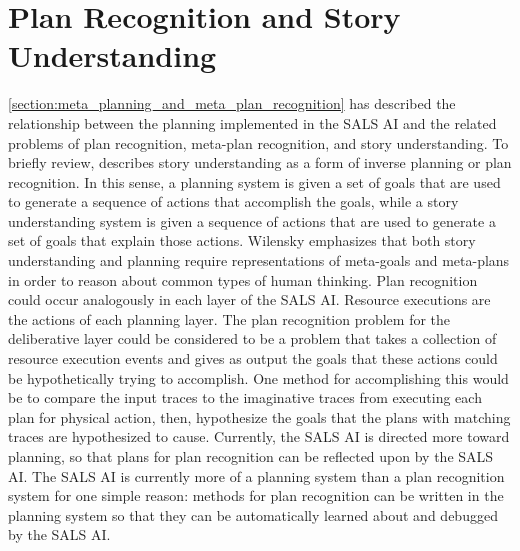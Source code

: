 \section{Plan Recognition and Story Understanding}

{\mbox{\autoref{section:meta_planning_and_meta_plan_recognition}}} has
described the relationship between the planning implemented in the
SALS AI and the related problems of plan recognition, meta-plan
recognition, and story understanding.  To briefly review,
\cite{wilensky:1981} describes story understanding as a form of
inverse planning or plan recognition.  In this sense, a planning
system is given a set of goals that are used to generate a sequence of
actions that accomplish the goals, while a story understanding system
is given a sequence of actions that are used to generate a set of
goals that explain those actions.  Wilensky emphasizes that both story
understanding and planning require representations of meta-goals and
meta-plans in order to reason about common types of human thinking.
Plan recognition could occur analogously in each layer of the SALS AI.
Resource executions are the actions of each planning layer.  The plan
recognition problem for the deliberative layer could be considered to
be a problem that takes a collection of resource execution events and
gives as output the goals that these actions could be hypothetically
trying to accomplish.  One method for accomplishing this would be to
compare the input traces to the imaginative traces from executing each
plan for physical action, then, hypothesize the goals that the plans
with matching traces are hypothesized to cause.  Currently, the SALS
AI is directed more toward planning, so that plans for plan
recognition can be reflected upon by the SALS AI.  The SALS AI is
currently more of a planning system than a plan recognition system for
one simple reason: methods for plan recognition can be written in the
planning system so that they can be automatically learned about and
debugged by the SALS AI.


